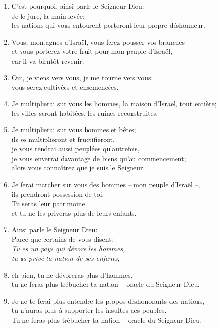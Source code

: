 \documentclass[12pt,a4paper,titlepage]{article}
\def \pslabelsep{0.2em} %
\def \psleftmargin{0em} %
\begin{document}
\begin{enumerate}[leftmargin=\psleftmargin, labelsep = \pslabelsep, label={\arabic*}, font=\color{\pscolor}\small\textsuperscript, parsep=0em, itemsep=0em, topsep=0em ]
\item  C’est pourquoi, ainsi parle le Seigneur Dieu: \\ Je le jure, la main levée: \\ les nations qui vous entourent porteront leur propre déshonneur.\verseSpace
\item  Vous, montagnes d’Israël, vous ferez pousser vos branches \\ et vous porterez votre fruit pour mon peuple d’Israël, \\ car il va bientôt revenir.
\item  Oui, je viens vers vous, je me tourne vers vous: \\ vous serez cultivées et ensemencées.
\item  Je multiplierai sur vous les hommes, la maison d’Israël, tout entière; \\ les villes seront habitées, les ruines reconstruites.
 \item  Je multiplierai sur vous hommes et bêtes; \\ ils se multiplieront et fructifieront, \\ je vous rendrai aussi peuplées qu’autrefois, \\ je vous enverrai davantage de biens qu’au commencement; \\ alors vous connaîtrez que je suis le Seigneur.
\item  Je ferai marcher sur vous des hommes – mon peuple d’Israël –, \\ ils prendront possession de toi. \\ Tu seras leur patrimoine \\ et tu ne les priveras plus de leurs enfants. \newpage
\item  Ainsi parle le Seigneur Dieu: \\ Parce que certains de vous disent: \\
 \decalage \og{}\emph{Tu es un pays qui dévore les hommes, \\ \decalage tu as privé ta nation de ses enfants}\fg{},
\item  eh bien, tu ne dévoreras plus d’hommes, \\ tu ne feras plus trébucher ta nation – oracle du Seigneur Dieu.
\item  Je ne te ferai plus entendre les propos déshonorants des nations, \\ tu n’auras plus à supporter les insultes des peuples. \\ Tu ne feras plus trébucher ta nation – oracle du Seigneur Dieu. \parSpace

\end{enumerate}
\end{document}
